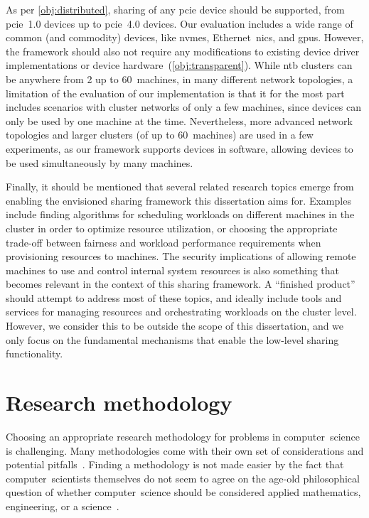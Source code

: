 As per \cref{obj:distributed}, sharing of any \gls{pcie} device should be supported, from \gls{pcie}~1.0 devices up to \gls{pcie}~4.0 devices.
%
Our evaluation includes a wide range of common (and commodity) devices, like \glspl{nvme}, Ethernet~\glspl{nic}, and \glspl{gpu}.
%
However, the framework should also not require any modifications to existing device driver implementations or device hardware~(\cref{obj:transparent}).
%
While \gls{ntb} clusters can be anywhere from 2 up to 60~machines, in many different network topologies, a limitation of the evaluation of our implementation is that it for the most part includes scenarios with cluster networks of only a few machines, since devices can only be used by one machine at the time.
%
Nevertheless, more advanced network topologies and larger clusters (of up to 60~machines) are used in a few experiments, as our framework supports  devices in software, allowing devices to be used simultaneously by many machines.



Finally, it should be mentioned that several related research topics emerge from enabling the envisioned sharing framework this dissertation aims for.
%
Examples include finding algorithms for scheduling workloads on different machines in the cluster in order to optimize resource utilization, or choosing the appropriate trade-off between fairness and workload performance requirements when provisioning resources to machines.
%
The security implications of allowing remote machines to use and control internal system resources is also something that becomes relevant in the context of this sharing framework.
%
A ``finished product'' should attempt to address most of these topics, and ideally include tools and services for managing resources and orchestrating workloads on the cluster level.
%
However, we consider this to be outside the scope of this dissertation, and we only focus on the fundamental mechanisms that enable the low-level sharing functionality.



\section{Research methodology}\label{sec:methodology}
Choosing an appropriate research methodology for problems in computer~science is challenging.
%
Many methodologies come with their own set of considerations and potential pitfalls~\cite{McGrath1981}.
%
Finding a methodology is not made easier by the fact that computer~scientists themselves do not seem to agree on the age-old philosophical question of whether computer~science should be considered applied mathematics, engineering, or a science~\cite{Denning2005}.


